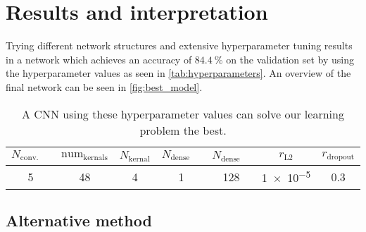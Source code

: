 \section{Results and interpretation}
\label{sec:results}
Trying different network structures and extensive hyperparameter tuning results in a network which achieves an accuracy of $\SI{84.4}{\percent}$ on the validation set by using the
hyperparameter values as seen in \autoref{tab:hyperparameters}.
An overview of the final network can be seen in \autoref{fig:best_model}.
\begin{table}
    \centering
    \caption{A CNN using these hyperparameter values can solve our learning problem the best.}
    \label{tab:hyperparameters}
    \begin{tabular}{c c c c c c c}
        \toprule
        $N_\text{conv. layers}$ & $\text{num}_\text{kernals}$ & $N_\text{kernal}$ & $N_\text{dense layers}$ & $N_\text{dense nodes}$ & $r_\text{L2}$ & $r_\text{dropout}$ \\
        \midrule
        5 & 48 & 4 & 1 & 128 & \num{1e-5} & 0.3\\
        \bottomrule
    \end{tabular}
\end{table}




\subsection{Alternative method}
